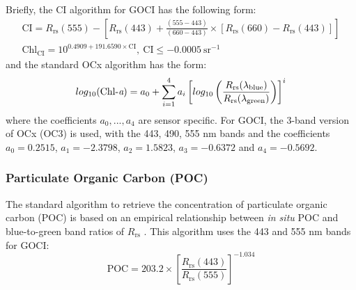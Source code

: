\documentclass[remotesensing,article,submit,moreauthors,pdftex,10pt,a4paper]{Definitions/mdpi}
\begin{document}
Briefly, the CI algorithm for GOCI has the following form: 
\begin{equation}
\begin{split}
  \text{CI}=R_\text{rs}(555)-\left[R_\text{rs}(443)+\frac{(555-443)}{(660-443)}\times [R_\text{rs}(660)-R_\text{rs}(443)]\right]\\
  \text{Chl}_{\text{CI}} = 10^{0.4909+191.6590\times \text{CI}},~\text{CI}\leq-0.0005~\text{sr}^{-1}
\end{split}  
\end{equation}
\noindent and the standard OCx algorithm has the form: 
\begin{equation}
  log_{10}(\text{Chl-{\it a}}) = a_0 + \sum_{i=1}^4 a_i \left[log_{10}\left(\frac{R_\text{rs}(\lambda_\text{blue})}{R_\text{rs}(\lambda_\text{green})}\right)\right]^i
\end{equation}
where the coefficients $a_0,...,a_4$ are sensor specific. For GOCI, the 3-band version of OCx (OC3) is used, with the 443, 490, 555 nm bands and the coefficients $a_0=0.2515$, $a_1=-2.3798$, $a_2=1.5823$, $a_3=-0.6372$ and $a_4=-0.5692$. 
\subsubsection{Particulate Organic Carbon (POC)}
The standard algorithm to retrieve the concentration of particulate organic carbon (POC) is based on an empirical relationship between {\it in situ} POC and blue-to-green band ratios of $R_\text{rs}$ \cite{Stramski2008}. This algorithm uses the 443 and 555 nm bands for GOCI:
\begin{equation}
  \text{POC} = 203.2\times \left[\frac{R_\text{rs}(443)}{R_\text{rs}(555)} \right]^{-1.034}
\end{equation}
\end{document}
